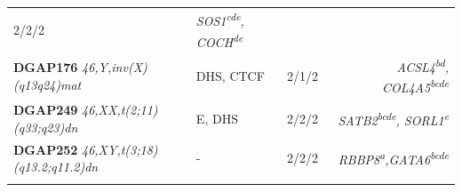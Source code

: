 \documentclass[a4paper,twoside=true,openright,parskip=full,chapterprefix=true,11pt,headings=normal,bibliography=totoc,listof=totoc,titlepage=on,captions=tableabove,draft=false]{scrreprt}
\theoremstyle{definition}
\theoremstyle{definition}
\theoremstyle{definition}
\theoremstyle{remark}
\begin{document}
\begin{longtable}[]{@{}lllr@{}}
\begin{minipage}[t]{0.26\columnwidth}
2/2/2\strut
\end{minipage} & \begin{minipage}[t]{0.18\columnwidth}\raggedleft
\emph{SOS1\textsuperscript{cde}, COCH\textsuperscript{de}}\strut
\end{minipage}\tabularnewline
\begin{minipage}[t]{0.25\columnwidth}\raggedright
\textbf{DGAP176} \emph{46,Y,inv(X)(q13q24)mat}\strut
\end{minipage} & \begin{minipage}[t]{0.19\columnwidth}\raggedright
DHS, CTCF\strut
\end{minipage} & \begin{minipage}[t]{0.26\columnwidth}\raggedright
2/1/2\strut
\end{minipage} & \begin{minipage}[t]{0.18\columnwidth}\raggedleft
\emph{ACSL4\textsuperscript{bd}, COL4A5\textsuperscript{bcde}}\strut
\end{minipage}\tabularnewline
\begin{minipage}[t]{0.25\columnwidth}\raggedright
\textbf{DGAP249} \emph{46,XX,t(2;11)(q33;q23)dn}\strut
\end{minipage} & \begin{minipage}[t]{0.19\columnwidth}\raggedright
E, DHS\strut
\end{minipage} & \begin{minipage}[t]{0.26\columnwidth}\raggedright
2/2/2\strut
\end{minipage} & \begin{minipage}[t]{0.18\columnwidth}\raggedleft
\emph{SATB2\textsuperscript{bcde}, SORL1\textsuperscript{e}}\strut
\end{minipage}\tabularnewline
\begin{minipage}[t]{0.25\columnwidth}\raggedright
\textbf{DGAP252} \emph{46,XY,t(3;18)(q13.2;q11.2)dn}\strut
\end{minipage} & \begin{minipage}[t]{0.19\columnwidth}\raggedright
-\strut
\end{minipage} & \begin{minipage}[t]{0.26\columnwidth}\raggedright
2/2/2\strut
\end{minipage} & \begin{minipage}[t]{0.18\columnwidth}\raggedleft
\emph{RBBP8\textsuperscript{a},GATA6\textsuperscript{bcde}}\strut
\end{minipage}\tabularnewline
\begin{minipage}[t]{0.25\columnwidth}\raggedright

\end{minipage}
\end{longtable}
\end{document}
